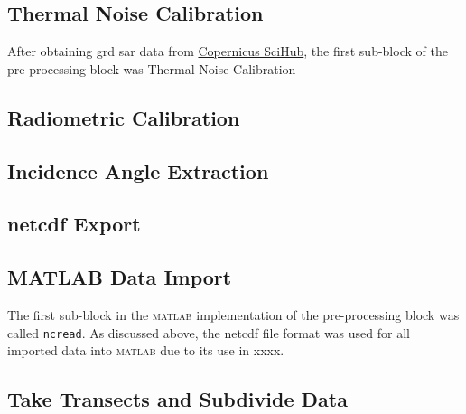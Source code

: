\subsection{Thermal Noise Calibration} \label{subsec:systemDesign.preProcessing.thermalNoise}

After obtaining \acs{grd} \acs{sar} data from \href{scihub.copernicus.eu/dhus/#/home}{Copernicus SciHub}, the first sub-block of the pre-processing block was Thermal Noise Calibration

\subsection{Radiometric Calibration} \label{subsec:systemDesign.preProcessing.radiometric}

\subsection{Incidence Angle Extraction} \label{subsec:systemDesign.preProcessing.incidenceAngle}

\subsection{\acs{netcdf} Export} \label{subsec:systemDesign.preProcessing.exportNetCDF}
\subsection{MATLAB Data Import} \label{subsec:systemDesign.preProcessing.importData}

The first sub-block in the \textsc{matlab} implementation of the pre-processing block was called \lstinline{ncread}. As discussed above, the \acs{netcdf} file format was used for all imported data into \textsc{matlab} due to its use in xxxx.

\subsection{Take Transects and Subdivide Data} \label{subsec:systemDesign.preProcessing.transects}

